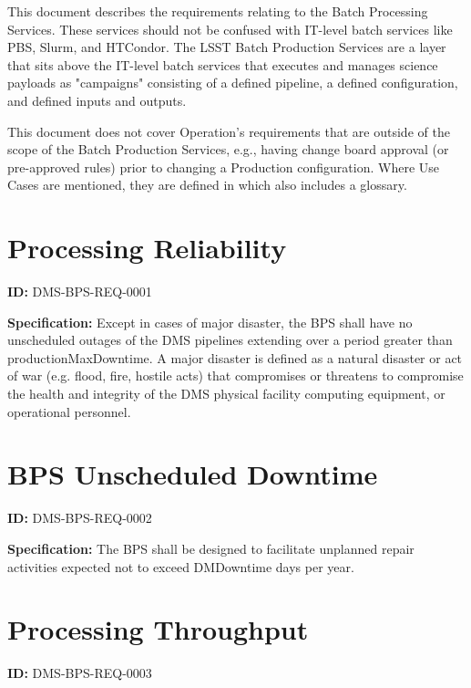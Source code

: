 \documentclass[SE,toc]{lsstdoc}
\date{2019-07-16}
\begin{document}
\maketitle

This document describes the requirements relating to the Batch Processing Services.  These services should not be confused with IT-level batch services like PBS, Slurm, and HTCondor.  The LSST Batch Production Services are a layer that sits above the IT-level batch services that executes and manages science payloads as "campaigns" consisting of a defined pipeline, a defined configuration, and defined inputs and outputs.

This document does not cover Operation’s requirements that are outside of the scope of the Batch Production Services, e.g., having change board approval (or pre-approved rules) prior to changing a Production configuration. Where Use Cases are mentioned, they are defined in  which also includes a glossary.

\section{Processing Reliability}

\label{DMS-BPS-REQ-0001}
\textbf{ID:} DMS-BPS-REQ-0001

\textbf{Specification:}
Except in cases of major disaster, the BPS shall have no unscheduled outages of the DMS pipelines extending over a period greater than productionMaxDowntime. A major disaster is defined as a natural disaster or act of war (e.g. flood, fire, hostile acts) that compromises or threatens to compromise the health and integrity of the DMS physical facility computing equipment, or operational personnel.

\section{BPS Unscheduled Downtime}

\label{DMS-BPS-REQ-0002}
\textbf{ID:} DMS-BPS-REQ-0002

\textbf{Specification:}
The BPS shall be designed to facilitate unplanned repair activities expected not to exceed DMDowntime days per year.

\section{Processing Throughput}

\label{DMS-BPS-REQ-0003}
\textbf{ID:} DMS-BPS-REQ-0003
\end{document}
